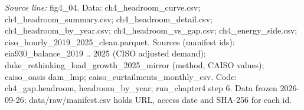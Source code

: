 {\scriptsize\textit{Source line:} fig4\_\allowbreak{}04. Data: ch4\_\allowbreak{}headroom\_\allowbreak{}curve.csv; ch4\_\allowbreak{}headroom\_\allowbreak{}summary.csv; ch4\_\allowbreak{}headroom\_\allowbreak{}detail.csv; ch4\_\allowbreak{}headroom\_\allowbreak{}by\_\allowbreak{}year.csv; ch4\_\allowbreak{}headroom\_\allowbreak{}vs\_\allowbreak{}gap.csv; ch4\_\allowbreak{}energy\_\allowbreak{}side.csv; ciso\_\allowbreak{}hourly\_\allowbreak{}2019\_\allowbreak{}2025\_\allowbreak{}clean.parquet. Sources (manifest ids): eia930\_\allowbreak{}balance\_\allowbreak{}2019 .. 2025 (CISO adjusted demand); duke\_\allowbreak{}rethinking\_\allowbreak{}load\_\allowbreak{}growth\_\allowbreak{}2025\_\allowbreak{}mirror (method, CAISO values); caiso\_\allowbreak{}oasis dam\_\allowbreak{}lmp; caiso\_\allowbreak{}curtailments\_\allowbreak{}monthly\_\allowbreak{}csv. Code: ch4\_\allowbreak{}gap.headroom, headroom\_\allowbreak{}by\_\allowbreak{}year; run\_\allowbreak{}chapter4 step 6. Data frozen 2026-09-26; data/raw/manifest.csv holds URL, access date and SHA-256 for each id.}